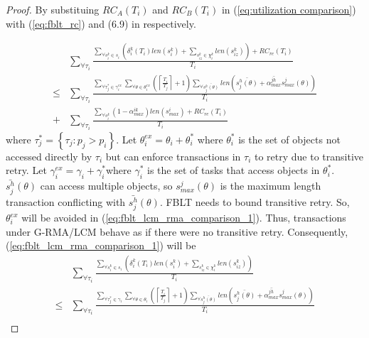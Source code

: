 \documentclass[12pt,english]{report}
\newtheorem{proof}{Proof}
\begin{document}
\begin{proof}

By substituing $RC_{A}(T_{i})$ and $RC_{B}(T_{i})$ in (\ref{eq:utilization comparison})
with (\ref{eq:fblt_rc}) and (6.9) in \cite{shambake_phd_proposal}
respectively. 

\begin{eqnarray}
 & \sum_{\forall\tau_{i}}\frac{\sum_{\forall s_{i}^{k}\in s_{i}}\left(\delta_{i}^{k}(T_{i})len(s_{i}^{k})+\sum_{s_{iz}^{k}\in\chi_{i}^{k}}len(s_{iz}^{k})\right)+RC_{re}(T_{i})}{T_{i}}\label{eq:fblt_lcm_rma_comparison_1}\\
\le & \sum_{\forall\tau_{i}}\frac{\sum_{\forall\tau_{j}^{*}\in\gamma_{i}^{ex}}\sum_{\forall\theta\in\theta_{i}^{ex}}\left(\left\lceil \frac{T_{i}}{T_{j}}\right\rceil +1\right)\sum_{\forall\bar{s_{j}^{h}(\theta)}}len\left(\bar{s_{j}^{h}(\theta)}+\bar{\alpha_{max}^{jh}}s_{max}^{j}(\theta)\right)}{T_{i}}\nonumber \\
+ & \sum_{\forall\tau_{i}}\frac{\sum_{\forall s_{i}^{k}}\left(1-\alpha_{max}^{ik}\right)len(s_{max}^{i})+RC_{re}(T_{i})}{T_{i}}\nonumber 
\end{eqnarray}
where $\tau_{j}^{*}=\left\{ \tau_{j}:p_{j}>p_{i}\right\} $. Let $\theta_{i}^{ex}=\theta_{i}+\theta_{i}^{*}$
where $\theta_{i}^{*}$ is the set of objects not accessed directly
by $\tau_{i}$ but can enforce transactions in $\tau_{i}$ to retry
due to transitive retry. Let $\gamma_{i}^{ex}=\gamma_{i}+\gamma_{i}^{*}$where
$\gamma_{i}^{*}$ is the set of tasks that access objects in $\theta_{i}^{*}$.
$\bar{s_{j}^{h}}(\theta)$ can access multiple objects, so $s_{max}^{j}(\theta)$
is the maximum length transaction conflicting with $\bar{s_{j}^{h}}(\theta)$.
FBLT needs to bound transitive retry. So, $\theta_{i}^{ex}$ will
be avoided in (\ref{eq:fblt_lcm_rma_comparison_1}). Thus, transactions
under G-RMA/LCM behave as if there were no transitive retry. Consequently,
(\ref{eq:fblt_lcm_rma_comparison_1}) will be 
\begin{eqnarray}
 & \sum_{\forall\tau_{i}}\frac{\sum_{\forall s_{i}^{k}\in s_{i}}\left(\delta_{i}^{k}(T_{i})len(s_{i}^{k})+\sum_{s_{iz}^{k}\in\chi_{i}^{k}}len(s_{iz}^{k})\right)}{T_{i}}\label{eq:fblt_lcm_rma_comparison_2}\\
\le & \sum_{\forall\tau_{i}}\frac{\sum_{\forall\tau_{j}^{*}\in\gamma_{i}}\sum_{\forall\theta\in\theta_{i}}\left(\left\lceil \frac{T_{i}}{T_{j}}\right\rceil +1\right)\sum_{\forall\bar{s_{j}^{h}(\theta)}}len\left(\bar{s_{j}^{h}(\theta)}+\bar{\alpha_{max}^{jh}}s_{max}^{j}(\theta)\right)}{T_{i}}\nonumber \\

\end{eqnarray}
\end{proof}
\end{document}
